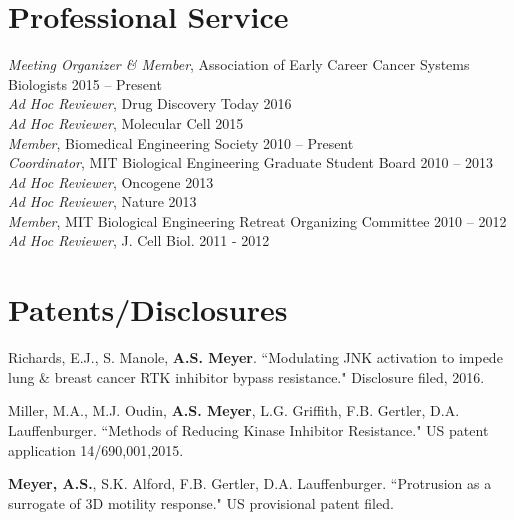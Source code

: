 \documentclass[11pt]{res}
\begin{document}
\begin{resume}
\section{Professional Service}

{\sl Meeting Organizer \& Member}, Association of Early Career Cancer Systems Biologists \hfill 2015 -- Present \\
{\sl Ad Hoc Reviewer}, Drug Discovery Today \hfill 2016 \\
{\sl Ad Hoc Reviewer}, Molecular Cell \hfill 2015 \\
{\sl Member}, Biomedical Engineering Society \hfill 2010 -- Present \\
{\sl Coordinator}, MIT Biological Engineering Graduate Student Board \hfill 2010 -- 2013 \\
{\sl Ad Hoc Reviewer}, Oncogene \hfill 2013 \\
{\sl Ad Hoc Reviewer}, Nature \hfill 2013 \\
{\sl Member}, MIT Biological Engineering Retreat Organizing Committee \hfill 2010 -- 2012 \\
{\sl Ad Hoc Reviewer}, J. Cell Biol. \hfill 2011 - 2012 \\

\section{Patents/Disclosures}

Richards, E.J., S. Manole, {\bf A.S. Meyer}. ``Modulating JNK activation to impede lung \& breast cancer RTK inhibitor bypass resistance." Disclosure filed, 2016.

Miller, M.A., M.J. Oudin, {\bf A.S. Meyer}, L.G. Griffith, F.B. Gertler, D.A. Lauffenburger. ``Methods of Reducing Kinase Inhibitor Resistance." US patent application 14/690,001,2015.

{\bf Meyer, A.S.}, S.K. Alford, F.B. Gertler, D.A. Lauffenburger. ``Protrusion as a surrogate of 3D motility response." US provisional patent filed.

\end{resume} 
\end{document}
